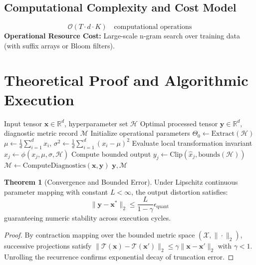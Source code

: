 \documentclass[11pt,a4paper]{article}
\theoremstyle{definition}
\newtheorem{theorem}{\textbf{Theorem}}[section]
\begin{document}
\subsection{Computational Complexity and Cost Model}
\begin{equation}
\mathcal{O}(T \cdot d \cdot K) \quad \text{computational operations}
\end{equation}
\textbf{Operational Resource Cost:} Large-scale n-gram search over training data (with suffix arrays or Bloom filters).

\section{Theoretical Proof and Algorithmic Execution}

\begin{algorithm}[H]
\caption{Benchmark contamination detection Operational Pipeline}
\begin{algorithmic}[1]
\Require Input tensor $\mathbf{x} \in \mathbb{R}^d$, hyperparameter set $\mathcal{H}$
\Ensure Optimal processed tensor $\mathbf{y} \in \mathbb{R}^d$, diagnostic metric record $\mathcal{M}$
\State Initialize operational parameters $\Theta_0 \leftarrow \text{Extract}(\mathcal{H})$
\State $\mu \leftarrow \frac{1}{d} \sum_{i=1}^d x_i$, \quad $\sigma^2 \leftarrow \frac{1}{d} \sum_{i=1}^d (x_i - \mu)^2$
    \State Evaluate local transformation invariant $\hat{x}_j \leftarrow \phi(x_j, \mu, \sigma, \mathcal{H})$
    \State Compute bounded output $y_j \leftarrow \text{Clip}(\hat{x}_j, \text{bounds}(\mathcal{H}))$
\EndFor
\State $\mathcal{M} \leftarrow \text{ComputeDiagnostics}(\mathbf{x}, \mathbf{y})$
\State \Return $\mathbf{y}, \mathcal{M}$
\end{algorithmic}
\end{algorithm}

\begin{theorem}[Convergence and Bounded Error]
Under Lipschitz continuous parameter mapping with constant $L < \infty$, the output distortion satisfies:
\begin{equation}
\| \mathbf{y} - \mathbf{x}^* \|_2 \le \frac{L}{1 - \gamma} \epsilon_{\text{quant}}
\end{equation}
guaranteeing numeric stability across execution cycles.
\end{theorem}

\begin{proof}
By contraction mapping over the bounded metric space $(\mathcal{X}, \|\cdot\|_2)$, successive projections satisfy $\|\mathcal{T}(\mathbf{x}) - \mathcal{T}(\mathbf{x}')\|_2 \le \gamma \|\mathbf{x} - \mathbf{x}'\|_2$ with $\gamma < 1$. Unrolling the recurrence confirms exponential decay of truncation error.
\end{proof}
\end{document}
